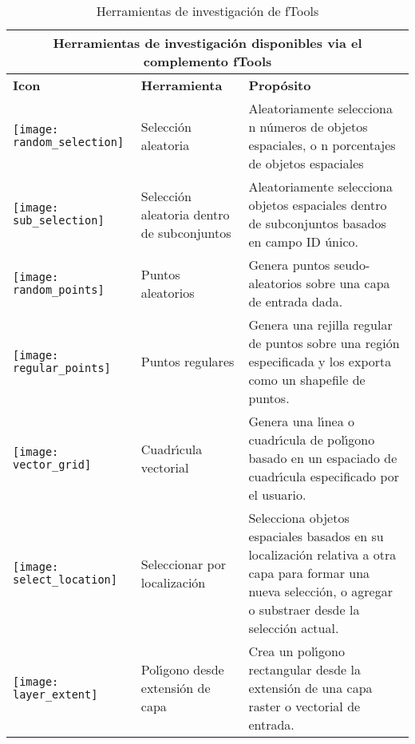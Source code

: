 \begin{table}[ht]
\centering
\caption{Herramientas de investigaci\'on de fTools}\label{tab:ftool_research}\medskip
 \begin{tabular}{|p{0.3in}|p{1.3in}|p{4.6in}|}
 \hline \multicolumn{3}{|c|}{\textbf{Herramientas de investigaci\'on disponibles via el complemento fTools}} \\
 \hline \textbf{Icon} & \textbf{Herramienta} & \textbf{Prop\'osito} \\
 \hline \texttt{[image: random\_selection]} & Selecci\'on aleatoria & Aleatoriamente 
selecciona n n\'umeros de objetos espaciales, o n porcentajes de objetos espaciales \\
 \hline \texttt{[image: sub\_selection]} & Selecci\'on aleatoria dentro de
 subconjuntos & Aleatoriamente selecciona objetos espaciales dentro de subconjuntos basados en campo ID \'unico. \\
 \hline \texttt{[image: random\_points]} & Puntos aleatorios & Genera 
puntos seudo-aleatorios sobre una capa de entrada dada. \\
 \hline \texttt{[image: regular\_points]} & Puntos regulares & Genera 
una rejilla regular de puntos sobre una regi\'on especificada y los exporta como un shapefile de puntos. \\
 \hline \texttt{[image: vector\_grid]} & Cuadr\'{\i}cula vectorial & Genera una 
l\'{\i}nea o cuadr\'{\i}cula de pol\'{\i}gono basado en un espaciado de cuadr\'{\i}cula especificado por el usuario. \\
 \hline \texttt{[image: select\_location]} & Seleccionar por localizaci\'on & 
Selecciona objetos espaciales basados en su localizaci\'on relativa a otra capa para formar una 
nueva selecci\'on, o agregar o substraer desde la selecci\'on actual. \\
\hline \texttt{[image: layer\_extent]} & Pol\'{\i}gono desde extensi\'on de capa & 
Crea un pol\'{\i}gono rectangular desde la extensi\'on de una capa raster o vectorial de entrada. \\
 \hline
\end{tabular}
\end{table}

